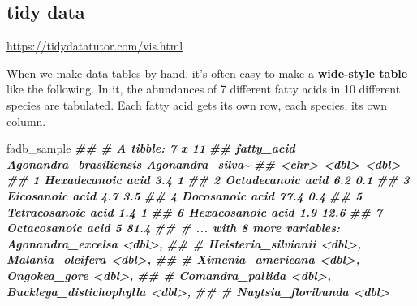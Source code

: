 \documentclass[
]{krantz}
\newenvironment{Shaded}{\begin{snugshade}}{\end{snugshade}}
\newcommand{\DocumentationTok}[1]{\textcolor[rgb]{0.56,0.35,0.01}{\textbf{\textit{#1}}}}
\newcommand{\NormalTok}[1]{#1}
\begin{document}
\hypertarget{tidy-data}{%
\subsection{tidy data}\label{tidy-data}}

\url{https://tidydatatutor.com/vis.html}

When we make data tables by hand, it's often easy to make a \textbf{wide-style table} like the following. In it, the abundances of 7 different fatty acids in 10 different species are tabulated. Each fatty acid gets its own row, each species, its own column.

\begin{Shaded}
\begin{Highlighting}[]
\NormalTok{fadb\_sample}
\DocumentationTok{\#\# \# A tibble: 7 x 11}
\DocumentationTok{\#\#   fatty\_acid         Agonandra\_brasiliensis Agonandra\_silva\textasciitilde{}}
\DocumentationTok{\#\#   \textless{}chr\textgreater{}                               \textless{}dbl\textgreater{}            \textless{}dbl\textgreater{}}
\DocumentationTok{\#\# 1 Hexadecanoic acid                     3.4              1  }
\DocumentationTok{\#\# 2 Octadecanoic acid                     6.2              0.1}
\DocumentationTok{\#\# 3 Eicosanoic acid                       4.7              3.5}
\DocumentationTok{\#\# 4 Docosanoic acid                      77.4              0.4}
\DocumentationTok{\#\# 5 Tetracosanoic acid                    1.4              1  }
\DocumentationTok{\#\# 6 Hexacosanoic acid                     1.9             12.6}
\DocumentationTok{\#\# 7 Octacosanoic acid                     5               81.4}
\DocumentationTok{\#\# \# ... with 8 more variables: Agonandra\_excelsa \textless{}dbl\textgreater{},}
\DocumentationTok{\#\# \#   Heisteria\_silvianii \textless{}dbl\textgreater{}, Malania\_oleifera \textless{}dbl\textgreater{},}
\DocumentationTok{\#\# \#   Ximenia\_americana \textless{}dbl\textgreater{}, Ongokea\_gore \textless{}dbl\textgreater{},}
\DocumentationTok{\#\# \#   Comandra\_pallida \textless{}dbl\textgreater{}, Buckleya\_distichophylla \textless{}dbl\textgreater{},}
\DocumentationTok{\#\# \#   Nuytsia\_floribunda \textless{}dbl\textgreater{}}
\end{Highlighting}
\end{Shaded}
\end{document}
